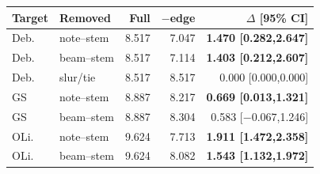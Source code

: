 \begin{center}
\begin{minipage}{\columnwidth}
\label{tab:edges}
\centering
\footnotesize
\setlength{\tabcolsep}{1.0pt}
\begin{tabular}{@{}llrrr@{}}
\toprule
Target & Removed & Full & $-$edge & $\Delta$ [95\% CI] \\
\midrule
Deb. & note--stem & 8.517 & 7.047 & \textbf{1.470 [0.282,2.647]} \\
Deb. & beam--stem & 8.517 & 7.114 & \textbf{1.403 [0.212,2.607]} \\
Deb. & slur/tie & 8.517 & 8.517 & 0.000 [0.000,0.000] \\
GS & note--stem & 8.887 & 8.217 & \textbf{0.669 [0.013,1.321]} \\
GS & beam--stem & 8.887 & 8.304 & 0.583 [$-0.067$,1.246] \\
OLi. & note--stem & 9.624 & 7.713 & \textbf{1.911 [1.472,2.358]} \\
OLi. & beam--stem & 9.624 & 8.082 & \textbf{1.543 [1.132,1.972]} \\
\bottomrule
\end{tabular}
\end{minipage}
\end{center}
